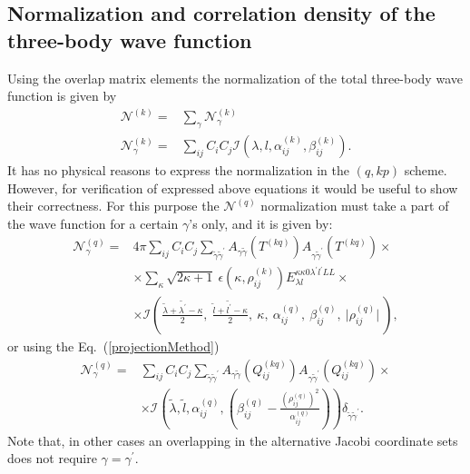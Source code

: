 \documentclass[12pt,a4paper,twoside]{article}
\begin{document}
\subsection{Normalization and correlation density of the three-body wave function}
Using the overlap matrix elements the normalization of the total three-body wave function is given by
\begin{align}
\mathcal{N}^{(k)}=& \sum_{\gamma} \mathcal{N}^{(k)}_{\gamma}   \nonumber \\
 \mathcal{N}^{(k)}_{\gamma} = & \sum_{ij} C_i C_j \mathcal{I} \left( \lambda,l,\alpha_{ij}^{(k)},\beta_{ij}^{(k)} \right).
\end{align}
It has no physical reasons to express the normalization in the $(q,kp)$ scheme. However, for verification of expressed above equations it would be useful to show their correctness. For this purpose the $\mathcal{N}^{(q)}$ normalization must take a part of the wave function for a certain $\gamma$'s only, and it is given by:
\begin{align}
\mathcal{N}^{(q)}_{\gamma}= & 4 \pi \sum_{ij} C_i C_j \sum_{\tilde{\gamma}\tilde{\gamma}^{\prime}}  A_{\gamma\tilde{\gamma}}\left( T^{(kq)} \right) A_{\gamma\tilde{\gamma}^{\prime}}\left( T^{(kq)} \right) \times
\nonumber \\
 & \times \sum_{\kappa} \sqrt{2\kappa+1}~ \epsilon(\kappa, \rho^{(k)}_{ij}) {E}^{\kappa \kappa 0 \lambda^{\prime} l^{\prime} L L}_{\lambda l} \times  \nonumber 
 \\ & \times \mathcal{I}\left(
 \tfrac{\tilde{\lambda}+\tilde{\lambda^{\prime}}-\kappa}{2}, ~
 \tfrac{\tilde{l}+\tilde{l^{\prime}}-\kappa}{2},~
 \kappa,~
 \alpha^{(q)}_{ij},~
 \beta^{(q)}_{ij} ,~
 \vert \rho^{(q)}_{ij} \vert ~
  \right),
\end{align}
or using the Eq.~(\ref{projectionMethod})
\begin{align}
\mathcal{N}^{(q)}_{\gamma}= & \sum_{ij} C_i C_j  \sum_{\tilde{\gamma}\tilde{\gamma}^{\prime}}
A_{\gamma\tilde{\gamma}}\left( Q_{ij}^{(kq)} \right)
 A_{\gamma\tilde{\gamma}^{\prime}}\left( Q_{ij}^{(kq)} \right) \times\nonumber \\
 & \times
  \mathcal{I} \left( \tilde{\lambda}, \tilde{l}, \alpha^{(q)}_{ij}, \left(  \beta^{(q)}_{ij} - \tfrac{\left(\rho^{(q)}_{ij}\right)^2}{\alpha^{(q)}_{ij}} \right) \right) \delta_{\tilde{\gamma}\tilde{\gamma}^{\prime}}.
\end{align}  
 Note that, in other cases an overlapping in the alternative Jacobi coordinate sets does not require $\gamma=\gamma^{\prime}$. 
\end{document}
